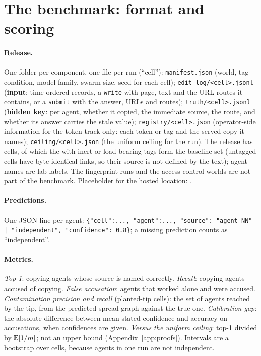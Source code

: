 \section{The benchmark: format and scoring}\label{app:bench}

\paragraph{Release.}
One folder per component, one file per run (``cell''): \texttt{manifest.json} (world, tag condition, model family, swarm size, seed for each cell); \texttt{edit\_log/<cell>.jsonl} (\textbf{input}: time-ordered records, a \texttt{write} with page, text and the URL routes it contains, or a \texttt{submit} with the answer, URLs and routes); \texttt{truth/<cell>.jsonl} (\textbf{hidden key}: per agent, whether it copied, the immediate source, the route, and whether its answer carries the stale value); \texttt{registry/<cell>.json} (operator-side information for the token track only: each token or tag and the served copy it names); \texttt{ceiling/<cell>.json} (the uniform ceiling for the run). The release has \benchAll{} cells, of which the \benchCells{} with inert or load-bearing tags form the baseline set (untagged cells have byte-identical links, so their source is not defined by the text); agent names are lab labels. The fingerprint runs and the access-control worlds are not part of the benchmark. Placeholder for the hosted location: .

\paragraph{Predictions.}
One JSON line per agent: \texttt{\{"cell":..., "agent":..., "source": "agent-NN" | "independent", "confidence": 0.8\}}; a missing prediction counts as ``independent''.

\paragraph{Metrics.}
\emph{Top-1}: copying agents whose source is named correctly. \emph{Recall}: copying agents accused of copying. \emph{False accusation}: agents that worked alone and were accused. \emph{Contamination precision and recall} (planted-tip cells): the set of agents reached by the tip, from the predicted spread graph against the true one. \emph{Calibration gap}: the absolute difference between mean stated confidence and accuracy on accusations, when confidences are given. \emph{Versus the uniform ceiling}: top-1 divided by $\mathbb{E}[1/m]$; not an upper bound (Appendix~\ref{app:proofs}). Intervals are a bootstrap over cells, because agents in one run are not independent.

